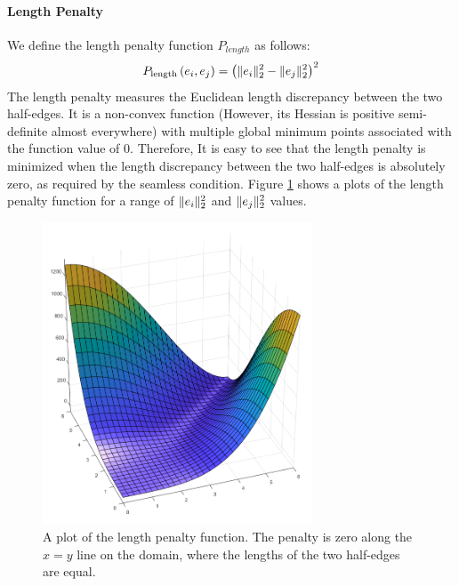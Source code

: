 \paragraph{Length Penalty}
We define the length penalty function $P_{length}$ as follows:
\begin{equation}\label{length_penalty}
\begin{split}
P_{\mathrm{length}}\left(e_i,e_j\right) = \left(\lVert e_i\rVert_2^2 - \lVert e_j\rVert_2^2\right)^2
\end{split}
\end{equation}
The length penalty measures the Euclidean length discrepancy between the two half-edges. It is a non-convex function (However, its Hessian is positive semi-definite almost everywhere) with multiple global minimum points associated with the function value of $0$. Therefore, It is easy to see that the length penalty is minimized when the length discrepancy between the two half-edges is absolutely zero, as required by the seamless condition. Figure \ref{fig:length_penalty} shows a plots of the length penalty function for a range of $\lVert e_i\rVert_2^2$ and $\lVert e_j\rVert_2^2$ values.
\begin{figure}[ht]
\centering
\includegraphics[width=8cm]{figures/seamless/length_penalty_function.png}
\caption[The Length Penalty Function]{A plot of the length penalty function. The penalty is zero along the $x=y$ line on the domain, where the lengths of the two half-edges are equal.}
\label{fig:length_penalty}
\end{figure}
